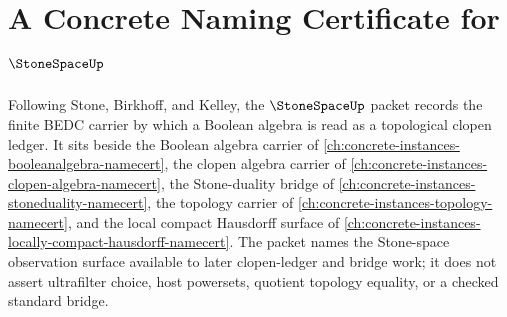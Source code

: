 \chapter{A Concrete Naming Certificate for $\StoneSpaceUp$}
\label{ch:concrete-instances-stone-space-namecert}

Following Stone, Birkhoff, and Kelley, the $\StoneSpaceUp$ packet records the finite BEDC carrier by which a Boolean algebra is read as a topological clopen ledger. It sits beside the Boolean algebra carrier of \autoref{ch:concrete-instances-booleanalgebra-namecert}, the clopen algebra carrier of \autoref{ch:concrete-instances-clopen-algebra-namecert}, the Stone-duality bridge of \autoref{ch:concrete-instances-stoneduality-namecert}, the topology carrier of \autoref{ch:concrete-instances-topology-namecert}, and the local compact Hausdorff surface of \autoref{ch:concrete-instances-locally-compact-hausdorff-namecert}. The packet names the Stone-space observation surface available to later clopen-ledger and bridge work; it does not assert ultrafilter choice, host powersets, quotient topology equality, or a checked standard bridge.

